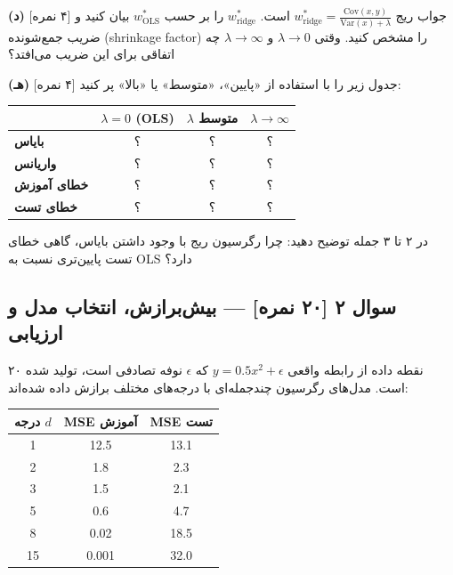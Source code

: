 \documentclass[12pt,a4paper]{article}
\begin{document}
\textbf{(د)} [۴ نمره] جواب ریج $w^*_{\text{ridge}} = \frac{\text{Cov}(x,y)}{\text{Var}(x) + \lambda}$ است. $w^*_{\text{ridge}}$ را بر حسب $w^*_{\text{OLS}}$ بیان کنید و ضریب جمع‌شونده (shrinkage factor) را مشخص کنید. وقتی $\lambda \to 0$ و $\lambda \to \infty$ چه اتفاقی برای این ضریب می‌افتد؟

\bigskip

\textbf{(هـ)} [۴ نمره] جدول زیر را با استفاده از «پایین»، «متوسط» یا «بالا» پر کنید:

\begin{center}
\begin{tabular}{|l|c|c|c|}
\hline
 & $\lambda = 0$ (OLS) & $\lambda$ متوسط & $\lambda \to \infty$ \\
\hline
\textbf{بایاس} & ؟ & ؟ & ؟ \\
\hline
\textbf{واریانس} & ؟ & ؟ & ؟ \\
\hline
\textbf{خطای آموزش} & ؟ & ؟ & ؟ \\
\hline
\textbf{خطای تست} & ؟ & ؟ & ؟ \\
\hline
\end{tabular}
\end{center}

در ۲ تا ۳ جمله توضیح دهید: چرا رگرسیون ریج با وجود داشتن بایاس، گاهی خطای تست پایین‌تری نسبت به OLS دارد؟

\newpage

\subsection*{سوال ۲ [۲۰ نمره] — بیش‌برازش، انتخاب مدل و ارزیابی}

۲۰ نقطه داده از رابطه واقعی $y = 0.5x^2 + \epsilon$ که $\epsilon$ نوفه تصادفی است، تولید شده است. مدل‌های رگرسیون چندجمله‌ای با درجه‌های مختلف برازش داده شده‌اند:

\begin{center}
\begin{tabular}{|c|c|c|}
\hline
درجه $d$ & MSE آموزش & MSE تست \\
\hline
1 & 12.5 & 13.1 \\
\hline
2 & 1.8 & 2.3 \\
\hline
3 & 1.5 & 2.1 \\
\hline
5 & 0.6 & 4.7 \\
\hline
8 & 0.02 & 18.5 \\
\hline
15 & 0.001 & 32.0 \\
\hline
\end{tabular}
\end{center}
\end{document}
